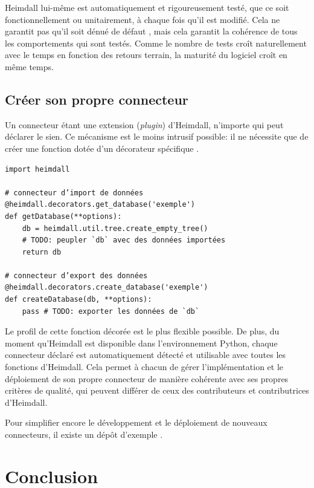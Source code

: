 \documentclass[final,fra]{anthology-ch}         %
\begin{document}
Heimdall lui-même est automatiquement et rigoureusement testé, que ce soit fonctionnellement ou unitairement, à chaque fois qu'il est modifié. Cela ne garantit pas qu'il soit dénué de défaut \autocite{0defect}, mais cela garantit la cohérence de tous les comportements qui sont testés. Comme le nombre de tests croît naturellement avec le temps en fonction des retours terrain, la maturité du logiciel croît en même temps.

\subsection{Créer son propre connecteur}\label{cruxe9er-son-propre-connecteur}

Un connecteur étant une extension (\emph{plugin}) d'Heimdall, n'importe qui peut déclarer le sien. Ce mécanisme est le moins intrusif possible: il ne nécessite que de créer une fonction dotée d'un décorateur spécifique \autocite{pep:318}.

\begin{verbatim}
import heimdall

# connecteur d’import de données
@heimdall.decorators.get_database('exemple')
def getDatabase(**options):
    db = heimdall.util.tree.create_empty_tree()
    # TODO: peupler `db` avec des données importées
    return db

# connecteur d’export des données
@heimdall.decorators.create_database('exemple')
def createDatabase(db, **options):
    pass # TODO: exporter les données de `db`
\end{verbatim}

Le profil de cette fonction décorée est le plus flexible possible. De plus, du moment qu'Heimdall est disponible dans l'environnement Python, chaque connecteur déclaré est automatiquement détecté et utilisable avec toutes les fonctions d'Heimdall. Cela permet à chacun de gérer l'implémentation et le déploiement de son propre connecteur de manière cohérente avec ses propres critères de qualité, qui peuvent différer de ceux des contributeurs et contributrices d'Heimdall.

Pour simplifier encore le développement et le déploiement de nouveaux connecteurs, il existe un dépôt d'exemple \autocite{pyheimdall-example}.

\section{Conclusion}\label{conclusion}
\end{document}
